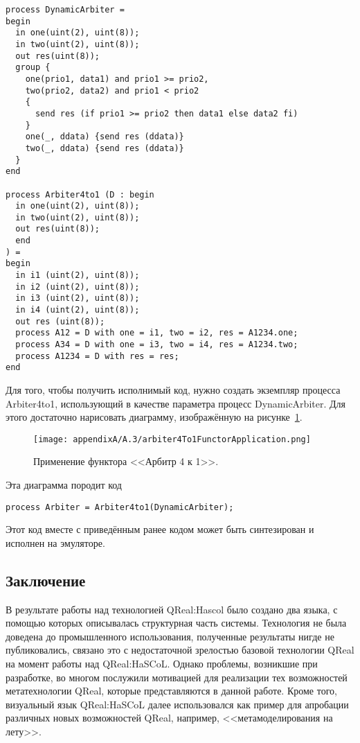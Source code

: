 \begin{listing}
\begin{verbatim}
process DynamicArbiter =
begin
  in one(uint(2), uint(8));
  in two(uint(2), uint(8));
  out res(uint(8));
  group {
    one(prio1, data1) and prio1 >= prio2,
    two(prio2, data2) and prio1 < prio2
    {
      send res (if prio1 >= prio2 then data1 else data2 fi)
    }
    one(_, ddata) {send res (ddata)}
    two(_, ddata) {send res (ddata)}
  }
end

process Arbiter4to1 (D : begin
  in one(uint(2), uint(8));
  in two(uint(2), uint(8));
  out res(uint(8));
  end
) =
begin
  in i1 (uint(2), uint(8));
  in i2 (uint(2), uint(8));
  in i3 (uint(2), uint(8));
  in i4 (uint(2), uint(8));
  out res (uint(8));
  process A12 = D with one = i1, two = i2, res = A1234.one;
  process A34 = D with one = i3, two = i4, res = A1234.two;
  process A1234 = D with res = res;
end
\end{verbatim}
\caption{Реализация арбитра 4 к 1 на языке HaSCoL.}
\label{listing:arbiter}
\end{listing}

Для того, чтобы получить исполнимый код, нужно создать экземпляр процесса Arbiter4to1, 
использующий в качестве параметра процесс DynamicArbiter. Для этого достаточно нарисовать 
диаграмму, изображённую на рисунке~\ref{image:arbiter4To1FunctorApplication}.

\begin{figure} [ht]
	\begin{center}
		\texttt{[image: appendixA/A.3/arbiter4To1FunctorApplication.png]}
		\caption{Применение функтора <<Арбитр 4 к 1>>.}
		\label{image:arbiter4To1FunctorApplication}
	\end{center}
\end{figure}

Эта диаграмма породит код 

\begin{verbatim}
process Arbiter = Arbiter4to1(DynamicArbiter);
\end{verbatim}

Этот код вместе с приведённым ранее кодом может быть синтезирован и исполнен на эмуляторе.

\subsection{Заключение}
В результате работы над технологией QReal:Hascol было создано два языка, с помощью 
которых описывалась структурная часть системы. Технология не была доведена до промышленного 
использования, полученные результаты нигде не публиковались, связано это с недостаточной 
зрелостью базовой технологии QReal на момент работы над QReal:HaSCoL. Однако проблемы, 
возникшие при разработке, во многом послужили мотивацией для реализации тех возможностей 
метатехнологии QReal, которые представляются в данной работе. Кроме того, визуальный язык 
QReal:HaSCoL далее использовался как пример для апробации различных новых возможностей 
QReal, например, <<метамоделирования на лету>>.

